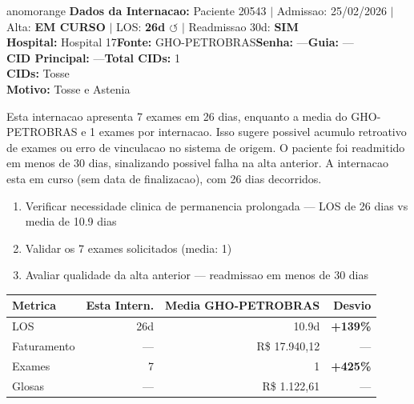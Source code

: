 \documentclass[a4paper,10pt]{article}
\begin{document}
\begin{anomalycard}[Internacao 166749 | GHO-PETROBRAS | ALTO (z=4.53)]{anomorange}
\textbf{Dados da Internacao:} Paciente 20543 $\mid$ Admissao: 25/02/2026 $\mid$ Alta: \textcolor{anomorange}{\textbf{EM CURSO}} $\mid$ LOS: \textbf{26d \textcolor{anomorange}{$\circlearrowleft$}} $\mid$ Readmissao 30d: \textcolor{anomred}{\textbf{SIM}}\\
\textbf{Hospital:} Hospital 17\quad\textbf{Fonte:} GHO-PETROBRAS\quad\textbf{Senha:} ---\quad\textbf{Guia:} ---\\
\textbf{CID Principal:} {\small ---}\quad\textbf{Total CIDs:} 1\\

\textbf{CIDs:} {\scriptsize Tosse}\\

\textbf{Motivo:} {\scriptsize Tosse e Astenia}\\

\vspace{2pt}\begin{tcolorbox}[colback=severityred!20,colframe=anomorange,title={\textbf{Interpretacao de Negocio}},fonttitle=\bfseries\small,left=4pt,right=4pt,top=3pt,bottom=3pt]
{\small Esta internacao apresenta 7 exames em 26 dias, enquanto a media do GHO-PETROBRAS e 1 exames por internacao. Isso sugere possivel acumulo retroativo de exames ou erro de vinculacao no sistema de origem. O paciente foi readmitido em menos de 30 dias, sinalizando possivel falha na alta anterior. A internacao esta em curso (sem data de finalizacao), com 26 dias decorridos.}
\end{tcolorbox}
\begin{tcolorbox}[colback=severityyellow!30,colframe=anomorange,title={\textbf{Recomendacoes Especificas}},fonttitle=\bfseries\small,left=4pt,right=4pt,top=3pt,bottom=3pt]
\begin{enumerate}[nosep,leftmargin=16pt]
\item {\small Verificar necessidade clinica de permanencia prolongada --- LOS de 26 dias vs media de 10.9 dias}
\item {\small Validar os 7 exames solicitados (media: 1)}
\item {\small Avaliar qualidade da alta anterior --- readmissao em menos de 30 dias}
\end{enumerate}
\end{tcolorbox}
\begin{center}\begin{tabular}{l r r r}\toprule\textbf{Metrica} & \textbf{Esta Intern.} & \textbf{Media GHO-PETROBRAS} & \textbf{Desvio} \\\midrule
LOS & 26d & 10.9d & \textcolor{anomred}{\textbf{+139\%}} \\
Faturamento & --- & R\$ 17.940,12 & --- \\
Exames & 7 & 1 & \textcolor{anomred}{\textbf{+425\%}} \\
Glosas & --- & R\$ 1.122,61 & --- \\
\bottomrule\end{tabular}\end{center}


\end{anomalycard}
\end{document}

